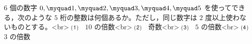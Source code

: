 $6$ 個の数字 $0,\myquad 1,\myquad 2,\myquad 3,\myquad 4,\myquad 5$ 
を使ってできる，次のような $5$ 桁の整数は何個あるか。ただし，同じ数字は $2$ 度以上使わないものとする。<br>
⑴　$10$ の倍数<br>
⑵　奇数<br>
⑶　$5$ の倍数<br>
⑷　$3$ の倍数
